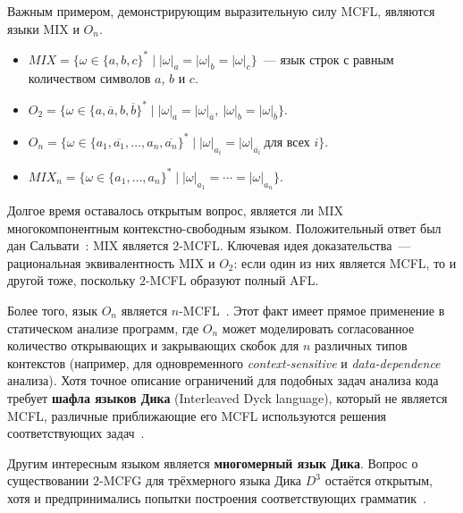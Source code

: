 Важным примером, демонстрирующим выразительную силу MCFL, являются языки MIX и $O_n$.

\begin{itemize}
    \item $MIX = \{\omega \in \{a,b,c\}^* \mid |\omega|_a = |\omega|_b = |\omega|_c\}$~--- язык строк с равным количеством символов $a$, $b$ и $c$.
    \item $O_2 = \{\omega \in \{a,\overline{a},b,\overline{b}\}^* \mid |\omega|_a = |\omega|_{\overline{a}},\ |\omega|_b = |\omega|_{\overline{b}}\}$.
    \item $O_n = \{\omega \in \{a_1,\overline{a_1},\ldots,a_n,\overline{a_n}\}^* \mid |\omega|_{a_i} = |\omega|_{\overline{a_i}}\ \text{для всех } i\}$.
    \item $MIX_n = \{\omega \in \{a_1,\ldots,a_n\}^* \mid |\omega|_{a_1} = \cdots = |\omega|_{a_n}\}$.
\end{itemize}

Долгое время оставалось открытым вопрос, является ли MIX многокомпонентным контекстно-свободным языком.
Положительный ответ был дан Сальвати~: MIX является $2$-MCFL.
Ключевая идея доказательства~--- рациональная эквивалентность MIX и $O_2$: если один из них является MCFL, то и другой тоже, поскольку $2$-MCFL образуют полный AFL.

Более того, язык $O_n$ является $n$-MCFL~.
Этот факт имеет прямое применение в статическом анализе программ, где $O_n$ может моделировать согласованное количество открывающих и закрывающих скобок для $n$ различных типов контекстов (например, для одновременного \emph{context-sensitive} и \emph{data-dependence} анализа).
Хотя точное описание ограничений для подобных задач анализа кода требует \textbf{шафла языков Дика} (Interleaved Dyck language),
который не является MCFL, различные приближающие его MCFL используются решения соответствующих задач~.

Другим интересным языком является \textbf{многомерный язык Дика}. Вопрос о существовании $2$-MCFG для трёхмерного языка Дика $D^3$ остаётся открытым, хотя и предпринимались попытки построения соответствующих грамматик~.



